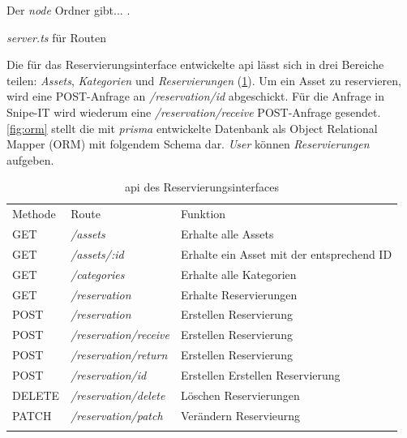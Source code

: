 Der \textit{node} Ordner gibt... .



\textit{server.ts} für Routen


Die für das Reservierungsinterface entwickelte api lässt sich in drei Bereiche teilen:
\textit{Assets}, \textit{Kategorien} und \textit{Reservierungen} (\ref{table:impl-backend-routes}).
Um ein Asset zu reservieren, wird eine POST-Anfrage an \textit{/reservation/id} abgeschickt. Für die
Anfrage in Snipe-IT wird wiederum eine \textit{/reservation/receive} POST-Anfrage gesendet.
\ref{fig:orm} stellt die mit \textit{prisma} entwickelte Datenbank als Object Relational Mapper
(ORM) mit folgendem Schema dar. \textit{User} können \textit{Reservierungen} aufgeben.


\begin{table}[h]
  \centering
  \caption{api des Reservierungsinterfaces}
  \begin{tabular}{lll}
    \arrayrulecolor{maincolor}\hline
    \sffamily\color{maincolor}Methode & \sffamily\color{maincolor}Route           & \sffamily\color{maincolor}Funktion             \\
    \arrayrulecolor{maincolor}\hline
      GET               & \textit{/assets}       & Erhalte alle Assets \\
      GET               & \textit{/assets/:id}   &
      Erhalte ein Asset mit der entsprechend ID                               \\
      GET               & \textit{/categories} &
      Erhalte alle Kategorien                                        \\
      GET               & \textit{/reservation} &
      Erhalte Reservierungen                                       \\
      POST              & \textit{/reservation}       &
      Erstellen Reservierung                                            \\
      POST              & \textit{/reservation/receive}       &
      Erstellen Reservierung                                           \\
      POST              & \textit{/reservation/return}       &
      Erstellen Reservierung                                                \\
      POST              & \textit{/reservation/id}       &
      Erstellen Erstellen Reservierung                                                \\
      DELETE            & \textit{/reservation/delete}   &
      Löschen Reservierungen                         \\
      PATCH               & \textit{/reservation/patch}   & Verändern Reservieurng       \\
    \arrayrulecolor{maincolor}\hline
  \end{tabular}
  \label{table:impl-backend-routes}
\end{table}

